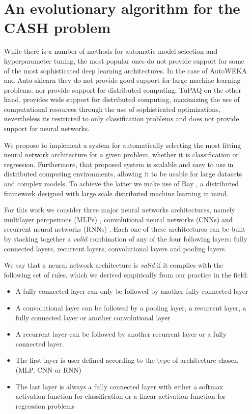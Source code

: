 \documentclass[journal]{IEEEtran}
\begin{document}

\section{An evolutionary algorithm for the CASH problem }
\label{sec:auto_nn}

While there is a number of methods for automatic model selection and hyperparameter tuning, the most popular ones do not provide support for some of the most sophisticated deep learning architectures. In the case of AutoWEKA and Auto-sklearn they do not provide good support for large machine learning problems, nor provide support for distributed computing. TuPAQ on the other hand, provides wide support for distributed computing, maximizing the use of computational resources through the use of sophisticated optimizations, nevertheless its restricted to only classification problems and does not provide support for neural networks.

We propose to implement a system for automatically selecting the most fitting neural network architecture for a given problem, whether it is classification or regression. Furthermore, that proposed system is scalable and easy to use in distributed computing environments, allowing it to be usable for large datasets and complex models. To achieve the latter we make use of Ray \cite{Moritz2017}, a distributed framework designed with large scale distributed machine learning in mind.

For this work we consider three major neural networks architectures, namely multilayer percpetrons (MLPs) \cite{Engelbrecht2007}, convolutional neural networks (CNNs) \cite{imagenet_cvpr09} and recurrent neural networks (RNNs) \cite{dblp_lipton_2015}. Each one of these architectures can be built by stacking together a \textit{valid} combination of any of the four following layers: fully connected layers, recurrent layers, convolutional layers and pooling layers.

We say that a neural network architecture is \textit{valid} if it complies with the following set of rules, which we derived empirically from our practice in the field:

\begin{itemize}
\item A fully connected layer can only be followed by another fully connected layer
\item A convolutional layer can be followed by a pooling layer, a recurrent layer, a fully connected layer or another convolutional layer
\item A recurrent layer can be followed by another recurrent layer or a fully connected layer.
\item The first layer is user defined according to the type of architecture chosen (MLP, CNN or RNN)
\item The last layer is always a fully connected layer with either a softmax activation function for classification or a linear activation function for regression problems
\end{itemize}
\end{document}
